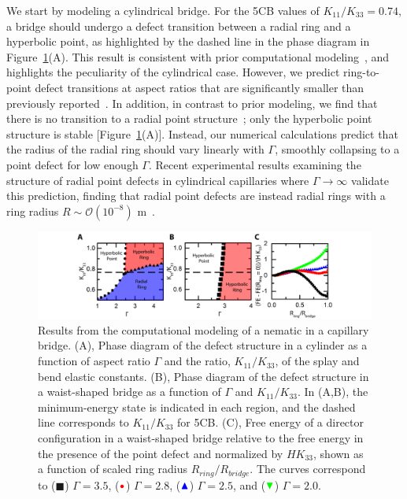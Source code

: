We start by modeling a cylindrical bridge.
For the 5CB values of $K_{11}/K_{33} = 0.74$, a bridge should undergo a defect transition between a radial ring and a hyperbolic point, as highlighted by the dashed line in the phase diagram in Figure~\ref{f:5-Calcs}(A).
This result is consistent with prior computational modeling~\cite{RN144}, and highlights the peculiarity of the cylindrical case.
However, we predict ring-to-point defect transitions at aspect ratios that are significantly smaller than previously reported~\cite{RN144}.
In addition, in contrast to prior modeling, we find that there is no transition to a radial point structure~\cite{RN144}; only the hyperbolic point structure is stable [Figure~\ref{f:5-Calcs}(A)].
Instead, our numerical calculations predict that the radius of the radial ring should vary linearly with $\Gamma$, smoothly collapsing to a point defect for low enough $\Gamma$.
Recent experimental results examining the structure of radial point defects in cylindrical capillaries where $\Gamma \rightarrow \infty$ validate this prediction, finding that radial point defects are instead radial rings with a ring radius $R \sim \mathcal{O}(10^{-8})$ m~\cite{RN280}.
\begin{figure}
  \centering
  \includegraphics{figures/C5/Ch5-Figs_Calcs.png}
  \caption{Results from the computational modeling of a nematic in a capillary bridge.
  (A), Phase diagram of the defect structure in a cylinder as a function of aspect ratio $\Gamma$ and the ratio, $K_{11}/K_{33}$, of the splay and bend elastic constants.
  (B), Phase diagram of the defect structure in a waist-shaped bridge as a function of $\Gamma$ and $K_{11}/K_{33}$.
  In (A,B), the minimum-energy state is indicated in each region, and the dashed line corresponds to $K_{11} / K_{33}$ for 5CB.\@
  (C), Free energy of a director configuration in a waist-shaped bridge relative to the free energy in the presence of the point defect and normalized by $H K_{33}$, shown as a function of scaled ring radius $R_{ring}/R_{bridge}$.
  The curves correspond to (${\blacksquare}$) $\Gamma = 3.5$, (${\color{red} \bullet}$) $\Gamma = 2.8$, (${\color{blue} \blacktriangle}$) $\Gamma = 2.5$, and (${\color{green} \blacktriangledown}$) $\Gamma = 2.0$.}\label{f:5-Calcs}
\end{figure}

